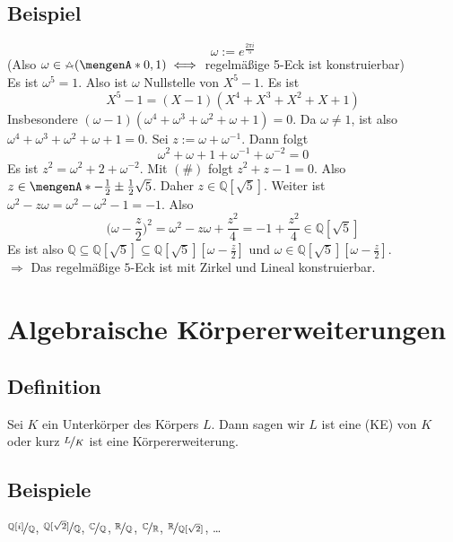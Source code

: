 \subsection[Beispiel: Das regelmäßige 5-Eck ist konstruierbar]{Beispiel} %
\label{sub:1012}
\[
	\omega := e^{\frac{2 \pi i}{5} } 
\]
(Also $\omega \in \zirkel (\set{0,1} ) \iff$ regelmäßige 5-Eck ist konstruierbar)\\
Es ist $\omega^5=1$. Also ist $\omega$ Nullstelle von $X^5-1$. Es ist 
\[
	X^5-1 =  (X-1)(X^4+X^3+X^2+X+1)
\]
Insbesondere $(\omega-1)(\omega^4+ \omega^3+\omega^2+ \omega+1) =0$. Da $\omega \not= 1$, ist also $\omega^4+ \omega^3+\omega^2+\omega +1 =0$.
Sei $z:= \omega + \omega ^{-1}$. Dann folgt 
\[
	\omega^2 + \omega +1 + \omega ^{-1} + \omega ^{-2}=0 \tag{$\#$}
\]
Es ist $z^2 = \omega^2+ 2 + \omega ^{-2}$. Mit $(\#)$ folgt $z^2+z-1=0$. Also $z \in \set{- \frac{1}{2} \pm \frac{1}{2} \sqrt{5}}$. Daher $z \in \mathds{Q}[\sqrt{5}]$.
Weiter ist $\omega^2- z \omega = \omega^2- \omega^2-1 = -1$. Also 
\[
	\big(\omega- \frac{z}{2} \big)^2 = \omega^2 - z \omega+ \frac{z^2}{4} = -1 + \frac{z^2}{4} \in \mathds{Q}[\sqrt{5}]  
\]
Es ist also $\mathds{Q} \subseteq \mathds{Q}[\sqrt{5}] \subseteq \mathds{Q}[\sqrt{5}][\omega- \frac{z}{2} ]$ und $\omega \in \mathds{Q}[\sqrt{5}][\omega - \frac{z}{2}]$.\\
$\Longrightarrow$ Das regelmäßige $5$-Eck ist mit Zirkel und Lineal konstruierbar. \bewende
\newpage

\section{Algebraische Körpererweiterungen} %
\label{sec:11}

\subsection[Definition: Körpererweiterung]{Definition} %
\label{sub:11.1}
Sei $K$ ein Unterkörper des Körpers $L$. Dann sagen wir $L$ ist eine  (KE) von $K$ oder kurz $\nicefrac{L}{K}$ ist eine Körpererweiterung. 

\subsection[Beispiele für Körpererweiterungen]{Beispiele} %
\label{sub:11.2}
$\nicefrac{\mathds{Q}[i]}{\mathds{Q}}$, $\nicefrac{\mathds{Q}[\sqrt{2}]}{\mathds{Q}}$, $\nicefrac{\mathds{C}}{\mathds{Q}}$, $\nicefrac{\mathds{R}}{\mathds{Q}}$,
$\nicefrac{\mathds{C}}{\mathds{R}}$, $\nicefrac{\mathds{R}}{\mathds{Q}[\sqrt{2} ]}$, \ldots 

